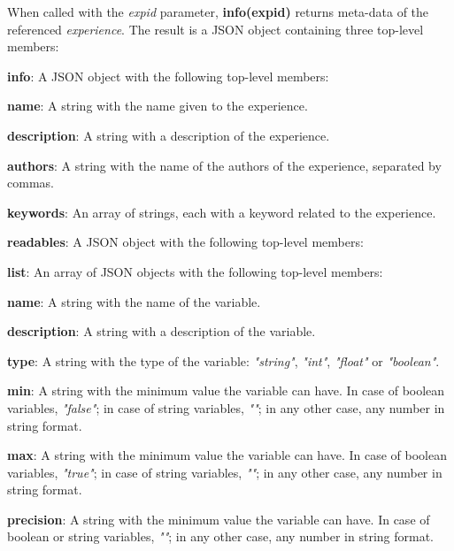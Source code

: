 When called with the \textit{expid} parameter, \textbf{info(expid)} returns meta-data of the referenced \textit{experience}. The result is a JSON object containing three top-level members:

\begin{myEnumerate}
    \item \textbf{info}: A JSON object with the following top-level members:
    \begin{myEnumerate}
        \item \textbf{name}: A string with the name given to the experience.
        \item \textbf{description}: A string with a description of the experience.
        \item \textbf{authors}: A string with the name of the authors of the experience, separated by commas.
        \item \textbf{keywords}: An array of strings, each with a keyword related to the experience.
    \end{myEnumerate}
    \item \textbf{readables}: A JSON object with the following top-level members:
    \begin{myEnumerate}
        \item \textbf{list}: An array of JSON objects with the following top-level members:
        \begin{myEnumerate}
            \item \textbf{name}: A string with the name of the variable.
            \item \textbf{description}: A string with a description of the variable.
            \item \textbf{type}: A string with the type of the variable: \textit{"string"}, \textit{"int"}, \textit{"float"} or \textit{"boolean"}.
            \item \textbf{min}: A string with the minimum value the variable can have. In case of boolean variables, \textit{"false"}; in case of string variables, \textit{""}; in any other case, any number in string format.
            \item \textbf{max}: A string with the minimum value the variable can have. In case of boolean variables, \textit{"true"}; in case of string variables, \textit{""}; in any other case, any number in string format.
            \item \textbf{precision}: A string with the minimum value the variable can have. In case of boolean or string variables, \textit{""}; in any other case, any number in string format.

\end{myEnumerate}
\end{myEnumerate}
\end{myEnumerate}
